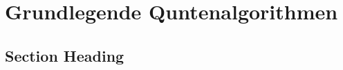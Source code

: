 \chapter{Grundlegende Quntenalgorithmen}
\label{basic_algorithms} %



\section{Section Heading}



